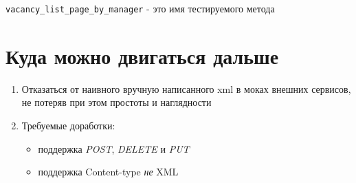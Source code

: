 \documentclass[12pt]{article}
\begin{document}
\verb+vacancy_list_page_by_manager+ - это имя тестируемого метода

\section{Куда можно двигаться дальше}

\begin{enumerate}
\item Отказаться от наивного вручную написанного xml в моках внешних сервисов, не потеряв при этом простоты и наглядности
\item Требуемые доработки:
\begin{itemize}
\item поддержка \emph{POST}, \emph{DELETE} и \emph{PUT}
\item поддержка Content-type \emph{не} XML

\end{itemize}

\end{enumerate}
\end{document}
